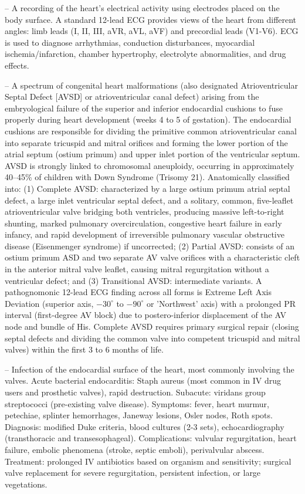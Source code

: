 -- A recording of the heart's electrical activity using electrodes placed on the body surface. A standard 12-lead ECG provides views of the heart from different angles: limb leads (I, II, III, aVR, aVL, aVF) and precordial leads (V1-V6). ECG is used to diagnose arrhythmias, conduction disturbances, myocardial ischemia/infarction, chamber hypertrophy, electrolyte abnormalities, and drug effects.

-- A spectrum of congenital heart malformations (also designated Atrioventricular Septal Defect [AVSD] or atrioventricular canal defect) arising from the embryological failure of the superior and inferior endocardial cushions to fuse properly during heart development (weeks 4 to 5 of gestation). The endocardial cushions are responsible for dividing the primitive common atrioventricular canal into separate tricuspid and mitral orifices and forming the lower portion of the atrial septum (ostium primum) and upper inlet portion of the ventricular septum. AVSD is strongly linked to chromosomal aneuploidy, occurring in approximately 40--45\% of children with Down Syndrome (Trisomy 21). Anatomically classified into: (1) Complete AVSD: characterized by a large ostium primum atrial septal defect, a large inlet ventricular septal defect, and a solitary, common, five-leaflet atrioventricular valve bridging both ventricles, producing massive left-to-right shunting, marked pulmonary overcirculation, congestive heart failure in early infancy, and rapid development of irreversible pulmonary vascular obstructive disease (Eisenmenger syndrome) if uncorrected; (2) Partial AVSD: consists of an ostium primum ASD and two separate AV valve orifices with a characteristic cleft in the anterior mitral valve leaflet, causing mitral regurgitation without a ventricular defect; and (3) Transitional AVSD: intermediate variants. A pathognomonic 12-lead ECG finding across all forms is Extreme Left Axis Deviation (superior axis, $-30^\circ$ to $-90^\circ$ or 'Northwest' axis) with a prolonged PR interval (first-degree AV block) due to postero-inferior displacement of the AV node and bundle of His. Complete AVSD requires primary surgical repair (closing septal defects and dividing the common valve into competent tricuspid and mitral valves) within the first 3 to 6 months of life.

-- Infection of the endocardial surface of the heart, most commonly involving the valves. Acute bacterial endocarditis: Staph aureus (most common in IV drug users and prosthetic valves), rapid destruction. Subacute: viridans group streptococci (pre-existing valve disease). Symptoms: fever, heart murmur, petechiae, splinter hemorrhages, Janeway lesions, Osler nodes, Roth spots. Diagnosis: modified Duke criteria, blood cultures (2-3 sets), echocardiography (transthoracic and transesophageal). Complications: valvular regurgitation, heart failure, embolic phenomena (stroke, septic emboli), perivalvular abscess. Treatment: prolonged IV antibiotics based on organism and sensitivity; surgical valve replacement for severe regurgitation, persistent infection, or large vegetations.

